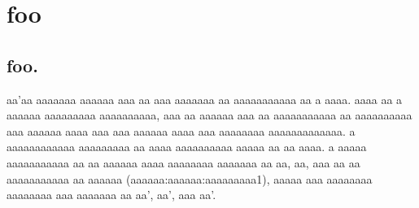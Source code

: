\documentclass[12pt,openany]{memoir}
\newcommand{\imageCentered}[4]{%
\begin{center}%
   \captionsetup{type=figure}%
\rule{350pt}{300pt} \par
   \caption{#2}%
   \label{#3}%
\end{center}%
}
\begin{document}
\chapter{foo}
\section{foo.}

aa'aa aaaaaaa aaaaaa aaa aa aaa aaaaaaa aa aaaaaaaaaaa aa a aaaa.  aaaa aa a aaaaaa aaaaaaaaa aaaaaaaaaa, aaa aa aaaaaa aaa aa aaaaaaaaaaa aa aaaaaaaaaa aaa aaaaaa aaaa aaa aaa aaaaaa aaaa aaa aaaaaaaa aaaaaaaaaaaaa.  a aaaaaaaaaaaa aaaaaaaaa aa aaaa aaaaaaaaaa aaaaa aa aa aaaa.  a aaaaa aaaaaaaaaaa aa aa aaaaaa aaaa aaaaaaaa aaaaaaa aa aa, aa, aaa aa aa aaaaaaaaaaa aa aaaaaa (aaa{aaa:aaaaaa:aaaaaaaaa1}), aaaaa aaa aaaaaaaa aaaaaaaa aaa aaaaaaa aa aa', aa', aaa aa'.

\end{document}
